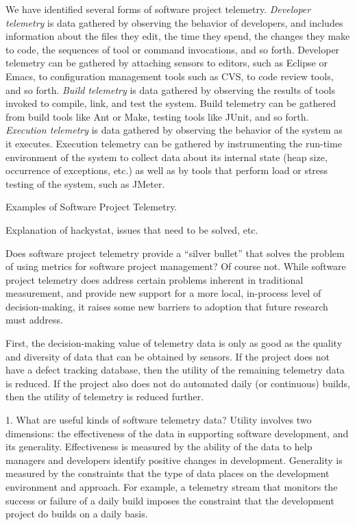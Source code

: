 \documentclass[11pt,twocolumn]{article}
\begin{document}
We have identified several forms of software project telemetry.  {\em
Developer telemetry} is data gathered by observing the behavior of
developers, and includes information about the files they edit, the time
they spend, the changes they make to code, the sequences of tool or command
invocations, and so forth. Developer telemetry can be gathered by attaching
sensors to editors, such as Eclipse or Emacs, to configuration management
tools such as CVS, to code review tools, and so forth.  {\em Build
telemetry} is data gathered by observing the results of tools invoked to
compile, link, and test the system. Build telemetry can be gathered from
build tools like Ant or Make, testing tools like JUnit, and so forth.  {\em
Execution telemetry} is data gathered by observing the behavior of the
system as it executes. Execution telemetry can be gathered by instrumenting
the run-time environment of the system to collect data about its internal
state (heap size, occurrence of exceptions, etc.) as well as by tools that
perform load or stress testing of the system, such as JMeter.






Examples of Software Project Telemetry.


Explanation of hackystat, issues that need to be solved, etc.


Does software project telemetry provide a ``silver bullet'' that solves the
problem of using metrics for software project management? Of course not.
While software project telemetry does address certain problems inherent in
traditional measurement, and provide new support for a more local,
in-process level of decision-making, it raises some new barriers to
adoption that future research must address.

First, the decision-making value of telemetry data is only as good as the
quality and diversity of data that can be obtained by sensors.  If the
project does not have a defect tracking database, then the utility of the
remaining telemetry data is reduced.  If the project also does not do
automated daily (or continuous) builds, then the utility of telemetry is
reduced further.   


   1. What are useful kinds of software telemetry data? Utility involves
   two dimensions: the effectiveness of the data in supporting software
   development, and its generality.  Effectiveness is measured by the
   ability of the data to help managers and developers identify positive
   changes in development. Generality is measured by the constraints that
   the type of data places on the development environment and approach. For
   example, a telemetry stream that monitors the success or failure of a
   daily build imposes the constraint that the development project do
   builds on a daily basis.
       
\end{document}
